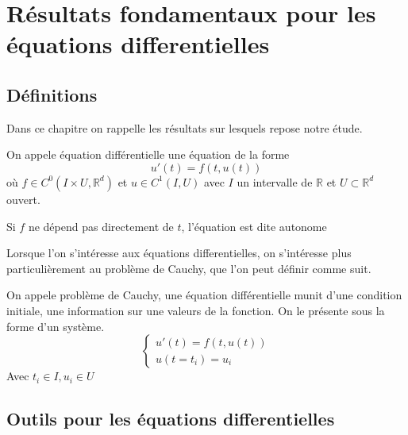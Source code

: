 \documentclass{article}
\newcommand{\R}{\mathbb{R}}
\newtheorem[M , nocut]{prop}{Proposition}[section]
\newtheorem[S , nocut]{definition}{Définition}
\newtheorem[S , nocut]{lemme}{Lemme}
\newtheorem[L , nocut]{thm}{Théoreme}
\newtheorem[L , nocut]{cor}{Corollaire}
\begin{document}
\newpage
\section{Résultats fondamentaux pour les équations differentielles}

\subsection{Définitions}
Dans ce chapitre on rappelle les résultats sur lesquels repose notre étude.
\begin{definition}
    On appele équation différentielle une équation de la forme
    \[
      u'(t) = f(t,u(t))  
    \]où $f \in C^0(I\times U,\R^d)$ et $u \in C^1(I,U)$ avec $I$ un intervalle de $\R$ et $U \subset \R^d$ ouvert.
\end{definition}
\begin{example}[Remarque]
    Si $f$ ne dépend pas directement de $t$, l'équation est dite autonome
\end{example}
Lorsque l'on s'intéresse aux équations differentielles, on s'intéresse plus particulièrement au problème de Cauchy, que l'on peut définir comme suit.
\begin{definition}
    On appele problème de Cauchy, une équation différentielle munit d'une condition initiale, une information sur une valeurs de la fonction. On le présente sous la forme d'un système.
    \[ \left\{ \begin{array}{l}
        u'(t) = f(t,u(t)) \\ 
        u(t=t_i) = u_i
    \end{array}\right. \]
    Avec $t_i\in I, u_i \in U$
\end{definition}

\subsection{Outils pour les équations differentielles}
\end{document}
